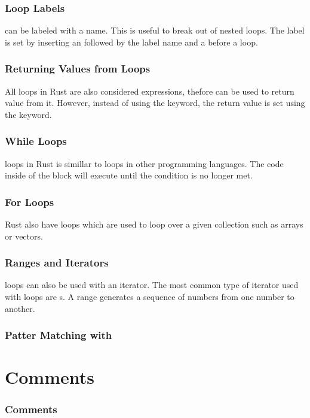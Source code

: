 \documentclass{beamer}
\begin{document}
\begin{frame}[allowframebreaks]
  \frametitle{Loop Labels}
   can be labeled with a name. This is useful to break out of nested loops. The label is set by inserting an  followed by the label name and a \inlinecode{:} before a loop.
  
\end{frame}

\begin{frame}
  \frametitle{Returning Values from Loops}
  All loops in Rust are also considered expressions, thefore can be used to return value from it. However, instead of using the  keyword, the return value is set using the  keyword.
  
\end{frame}

\begin{frame}
  \frametitle{While Loops}
   loops in Rust is simillar to  loops in other programming languages. The code inside of the block will execute until the condition is no longer met.
  
\end{frame}

\begin{frame}
  \frametitle{For Loops}
  Rust also have  loops which are used to loop over a given collection such as arrays or vectors.
  
\end{frame}

\begin{frame}
  \frametitle{Ranges and Iterators}
   loops can also be used with an iterator. The most common type of iterator used with  loops are s. A range generates a sequence of numbers from one number to another.
  
\end{frame}

\begin{frame}
  \frametitle{Patter Matching with }
\end{frame}

\section{Comments}
\begin{frame}
  \frametitle{Comments}
\end{frame}

\appendix
\end{document}
